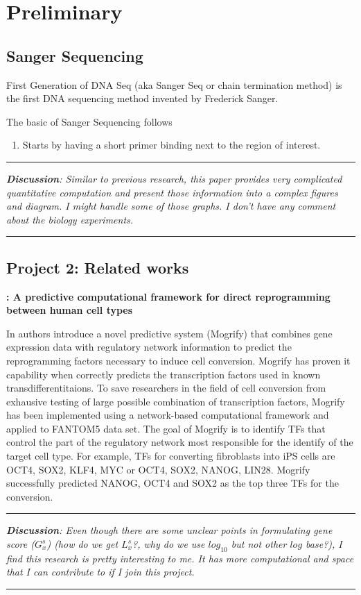 \documentclass[11pt, a4paper]{article}
\begin{document}
\section{Preliminary}
\subsection{Sanger Sequencing}
First Generation of DNA Seq (aka Sanger Seq or chain termination method) is the first DNA sequencing method invented by Frederick Sanger. 

The basic of Sanger Sequencing follows 
\begin{enumerate}
    \item Starts by having a short primer binding next to the region of interest. 
\end{enumerate}

\bigskip
\hrule
\bigskip
\textit{\textbf{Discussion}: Similar to previous research, this paper provides very complicated quantitative computation and present those information into a complex figures and diagram. I might handle some of those graphs. I don't have any comment about the biology experiments. }     
\bigskip
\hrule
\bigskip

\subsection{Project 2: Related works}
\textbf{\cite{rackham2016}: A predictive computational framework for direct reprogramming between human cell types}

In \cite{rackham2016} authors introduce a novel predictive system (Mogrify) that combines gene expression data with regulatory network information to predict the reprogramming factors necessary to induce cell conversion. Mogrify has proven it capability when correctly predicts the transcription factors used in known transdifferentitaions. To save researchers in the field of cell conversion from exhausive testing of large possible combination of transcription factors, Mogrify has been implemented using a network-based computational framework and applied to FANTOM5 data set. The goal of Mogrify is to identify TFs that control the part of the regulatory network most responsible for the identify of the target cell type. For example, TFs for converting fibroblasts into iPS cells are OCT4, SOX2, KLF4, MYC or OCT4, SOX2, NANOG, LIN28. Mogrify successfully predicted NANOG, OCT4 and SOX2 as the top three TFs for the conversion.

\bigskip
\hrule
\bigskip
\textit{\textbf{Discussion}: Even though there are some unclear points in formulating gene score ($G_{x}^{s}$) (how do we get $L_{x}^{s}$?, why do we use $log_{10}$ but not other $log$ base?), I find this research is pretty interesting to me. It has more computational and space that I can contribute to if I join this project.}     
\bigskip
\hrule
\bigskip

\end{document}
